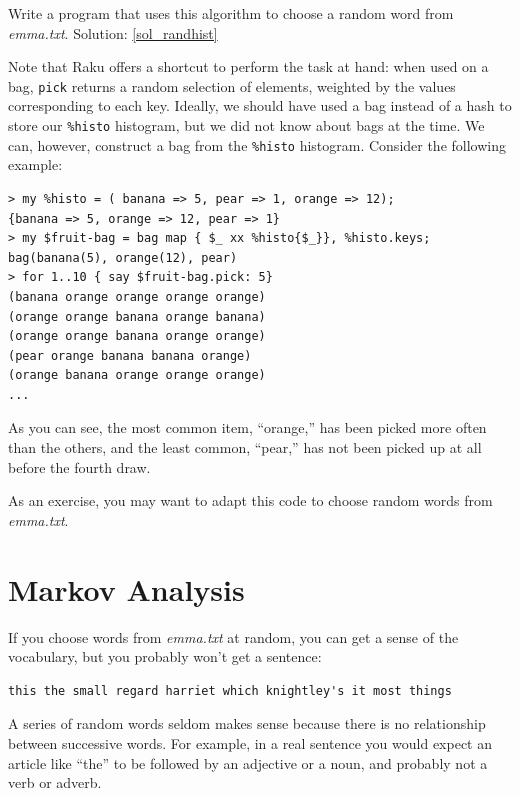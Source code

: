 \begin{exercise}
\label{randhist}

Write a program that uses this algorithm to choose a random 
word from \emph{emma.txt}.  
Solution: \ref{sol_randhist}
\end{exercise}

Note that Raku offers a shortcut to perform the task 
at hand: when used on a bag, {\tt pick} returns a random 
selection of elements, weighted by the values corresponding 
to each key. Ideally, we should have used a bag instead of 
a hash to store our \verb'%histo' histogram, but we did not 
know about bags at the time. We can, however, construct a 
bag from the \verb'%histo' histogram. Consider the following 
example:

\begin{verbatim}
> my %histo = ( banana => 5, pear => 1, orange => 12);
{banana => 5, orange => 12, pear => 1}
> my $fruit-bag = bag map { $_ xx %histo{$_}}, %histo.keys;
bag(banana(5), orange(12), pear)
> for 1..10 { say $fruit-bag.pick: 5}
(banana orange orange orange orange)
(orange orange banana orange banana)
(orange orange banana orange orange)
(pear orange banana banana orange)
(orange banana orange orange orange)
...
\end{verbatim}

As you can see, the most common item, ``orange,'' has been 
picked more often than the others, and the least common, 
``pear,'' has not been picked up at all before the fourth 
draw. 

As an exercise, you may want to adapt this code to 
choose random words from \emph{emma.txt}.



\section{Markov Analysis}
\label{markov}

If you choose words from \emph{emma.txt} at random, you can get a
sense of the vocabulary, but you probably won't get a sentence:

\begin{verbatim}
this the small regard harriet which knightley's it most things
\end{verbatim}
%
A series of random words seldom makes sense because there
is no relationship between successive words.  For example, in
a real sentence you would expect an article like ``the'' to
be followed by an adjective or a noun, and probably not a verb
or adverb.

